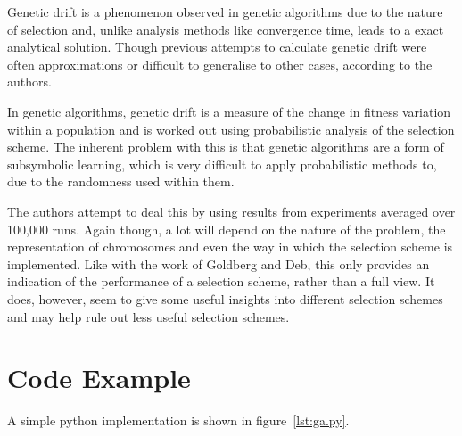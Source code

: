 \documentclass[10pt, a4paper]{article}
\begin{document}
Genetic drift is a phenomenon observed in genetic algorithms due to the nature
of selection and, unlike analysis methods like convergence time, leads to a
exact analytical solution. Though previous attempts to calculate genetic drift
were often approximations or difficult to generalise to other cases, according
to the authors.

In genetic algorithms, genetic drift is a measure of the change in fitness
variation within a population and is worked out using probabilistic analysis of
the selection scheme. The inherent problem with this is that genetic algorithms
are a form of subsymbolic learning, which is very difficult to apply 
probabilistic methods to, due to the randomness used within them.

The authors attempt to deal this by using results from experiments averaged 
over 100,000 runs. Again though, a lot will depend on the nature of the 
problem, the representation of chromosomes and even the way in which the
selection scheme is implemented. Like with the work of Goldberg and Deb, this 
only provides an indication of the performance of a selection scheme, rather
than a full view. It does, however, seem to give some useful insights into 
different selection schemes and may help rule out less useful selection 
schemes.




\newpage
\section{Code Example}
A simple python implementation is shown in figure~\ref{lst:ga.py}.







\end{document}
